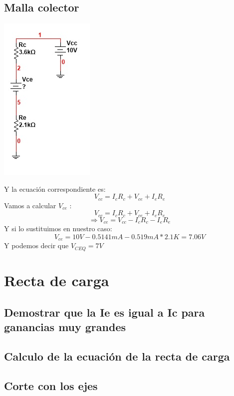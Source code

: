 \documentclass[10pt,a4paper]{article}
\begin{document}
\subsection{Malla colector}
\begin{center}
\includegraphics[scale=1]{Images/Imagen7.jpg}
\end{center}
Y la ecuación correspondiente es:
\begin{equation}
V_{cc}=I_{c}R_{c}+V_{ce}+I_{e}R_{e}
\end{equation}
Vamos a calcular $V_{ce}$ :
\[V_{cc}=I_{c}R_{c}+V_{ce}+I_{e}R_{e}\]
\[\Rightarrow V_{ce}= V_{cc}-I_{c}R_{c}-I_{e}R_{e}\]
Y si lo sustituimos en nuestro caso:
\[V_{ce}= 10V-0.5141mA-0.519mA*2.1K= 7.06V\]
Y podemos decir que $V_{CEQ}=7V$
\section{Recta de carga}
\subsection{Demostrar que la Ie es igual a Ic para ganancias muy grandes}
\subsection{Calculo de la ecuación de la recta de carga}
\subsection{Corte con los ejes}
\end{document}
